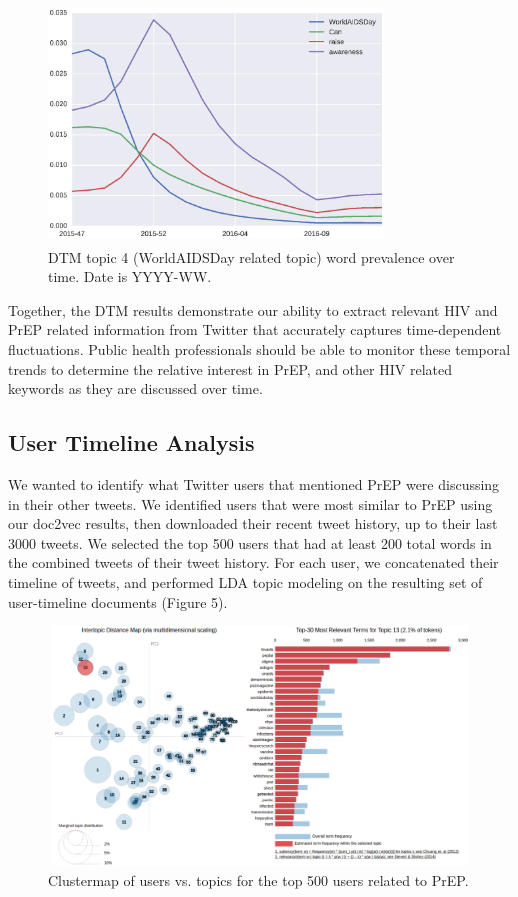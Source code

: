\documentclass{sig-alternate-05-2015}
\begin{document}
\begin{figure}
\centering
\includegraphics[height=2.5in, width=3.5in]{DTMfig2}
\caption{DTM topic 4 (WorldAIDSDay related topic) word prevalence over time. Date is YYYY-WW.}
\end{figure}

Together, the DTM results demonstrate our ability to extract relevant HIV and PrEP related information from Twitter that accurately captures time-dependent fluctuations. Public health professionals should be able to monitor these temporal trends to determine the relative interest in PrEP, and other HIV related keywords as they are discussed over time.

\subsection{User Timeline Analysis}

We wanted to identify what Twitter users that mentioned PrEP were discussing in their other tweets. We identified users that were most similar to PrEP using our doc2vec results, then downloaded their recent tweet history, up to their last 3000 tweets. We selected the top 500 users that had at least 200 total words in the combined tweets of their tweet history. For each user, we concatenated their timeline of tweets, and performed LDA topic modeling on the resulting set of user-timeline documents (Figure 5).

\begin{figure}
\centering
\includegraphics[height=2.5in, width=5in]{LDA_user_timelines}
\caption{Clustermap of users vs. topics for the top 500 users related to PrEP.}
\end{figure}
\end{document}
